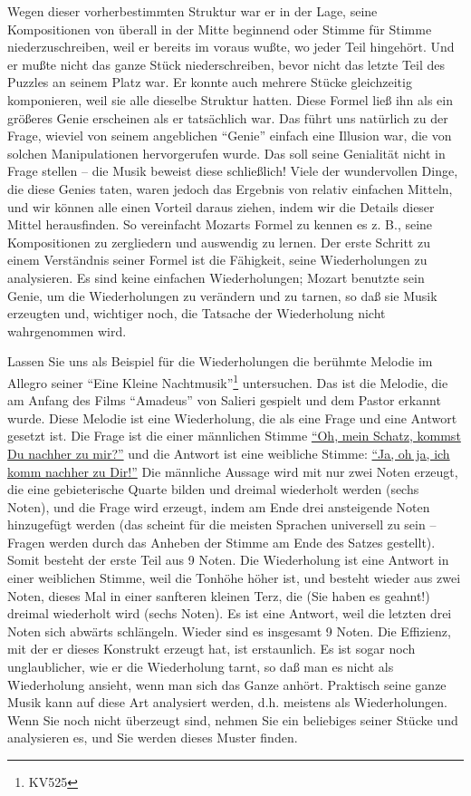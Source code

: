 Wegen dieser vorherbestimmten Struktur war er in der Lage, seine Kompositionen von überall in der Mitte beginnend oder Stimme für Stimme niederzuschreiben, weil er bereits im voraus wußte, wo jeder Teil hingehört.
Und er mußte nicht das ganze Stück niederschreiben, bevor nicht das letzte Teil des Puzzles an seinem Platz war.
Er konnte auch mehrere Stücke gleichzeitig komponieren, weil sie alle dieselbe Struktur hatten.
Diese Formel ließ ihn als ein größeres Genie erscheinen als er tatsächlich war.
Das führt uns natürlich zu der Frage, wieviel von seinem angeblichen \enquote{Genie} einfach eine Illusion war, die von solchen Manipulationen hervorgerufen wurde.
Das soll seine Genialität nicht in Frage stellen -- die Musik beweist diese schließlich!
Viele der wundervollen Dinge, die diese Genies taten, waren jedoch das Ergebnis von relativ einfachen Mitteln, und wir können alle einen Vorteil daraus ziehen, indem wir die Details dieser Mittel herausfinden.
So vereinfacht Mozarts Formel zu kennen es z. B., seine Kompositionen zu zergliedern und auswendig zu lernen.
Der erste Schritt zu einem Verständnis seiner Formel ist die Fähigkeit, seine Wiederholungen zu analysieren.
Es sind keine einfachen Wiederholungen; Mozart benutzte sein Genie, um die Wiederholungen zu verändern und zu tarnen, so daß sie Musik erzeugten und, wichtiger noch, die Tatsache der Wiederholung nicht wahrgenommen wird.


\label{KV525}

Lassen Sie uns als Beispiel für die Wiederholungen die berühmte Melodie im Allegro seiner \enquote{Eine Kleine Nachtmusik}\footnote{KV525} untersuchen.
Das ist die Melodie, die am Anfang des Films \enquote{Amadeus} von Salieri gespielt und dem Pastor erkannt wurde.
Diese Melodie ist eine Wiederholung, die als eine Frage und eine Antwort gesetzt ist.
Die Frage ist die einer männlichen Stimme \hyperref[ueb-KV525]{\enquote{Oh, mein Schatz, kommst Du nachher zu mir?}} und die Antwort ist eine weibliche Stimme: \hyperref[ueb-KV525]{\enquote{Ja, oh ja, ich komm nachher zu Dir!}}
Die männliche Aussage wird mit nur zwei Noten erzeugt, die eine gebieterische Quarte bilden und dreimal wiederholt werden (sechs Noten), und die Frage wird erzeugt, indem am Ende drei ansteigende Noten hinzugefügt werden (das scheint für die meisten Sprachen universell zu sein -- Fragen werden durch das Anheben der Stimme am Ende des Satzes gestellt).
Somit besteht der erste Teil aus 9 Noten.
Die Wiederholung ist eine Antwort in einer weiblichen Stimme, weil die Tonhöhe höher ist, und besteht wieder aus zwei Noten, dieses Mal in einer sanfteren kleinen Terz, die (Sie haben es geahnt!) dreimal wiederholt wird (sechs Noten).
Es ist eine Antwort, weil die letzten drei Noten sich abwärts schlängeln.
Wieder sind es insgesamt 9 Noten.
Die Effizienz, mit der er dieses Konstrukt erzeugt hat, ist erstaunlich.
Es ist sogar noch unglaublicher, wie er die Wiederholung tarnt, so daß man es nicht als Wiederholung ansieht, wenn man sich das Ganze anhört.
Praktisch seine ganze Musik kann auf diese Art analysiert werden, d.h. meistens als Wiederholungen.
Wenn Sie noch nicht überzeugt sind, nehmen Sie ein beliebiges seiner Stücke und analysieren es, und Sie werden dieses Muster finden.

